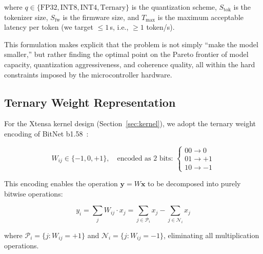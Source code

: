 \noindent where $q \in \{\text{FP32}, \text{INT8}, \text{INT4}, \text{Ternary}\}$
is the quantization scheme, $S_{\text{tok}}$ is the tokenizer size,
$S_{\text{fw}}$ is the firmware size, and $T_{\max}$ is the maximum acceptable
latency per token (we target $\leq 1$\,s, i.e., $\geq 1$ token/s).

This formulation makes explicit that the problem is not simply ``make the model
smaller,'' but rather finding the optimal point on the Pareto frontier of
model capacity, quantization aggressiveness, and coherence quality, all within
the hard constraints imposed by the microcontroller hardware.

\subsection{Ternary Weight Representation}

For the Xtensa kernel design (Section~\ref{sec:kernel}), we adopt the ternary
weight encoding of BitNet b1.58~\cite{ma2024bitnet}:

\begin{equation}
W_{ij} \in \{-1, 0, +1\}, \quad \text{encoded as 2 bits: } \begin{cases}
00 \rightarrow 0 \\
01 \rightarrow +1 \\
10 \rightarrow -1
\end{cases}
\label{eq:ternary}
\end{equation}

This encoding enables the \gemv{} operation $\mathbf{y} = W\mathbf{x}$ to be
decomposed into purely bitwise operations:

\begin{equation}
y_i = \sum_{j} W_{ij} \cdot x_j
    = \sum_{j \in \mathcal{P}_i} x_j - \sum_{j \in \mathcal{N}_i} x_j
\label{eq:bitwise_gemv}
\end{equation}

\noindent where $\mathcal{P}_i = \{j : W_{ij} = +1\}$ and
$\mathcal{N}_i = \{j : W_{ij} = -1\}$, eliminating all multiplication
operations.
